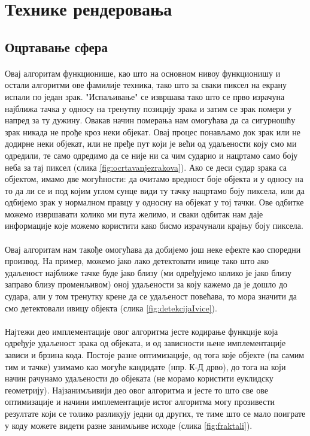 \documentclass[12pt]{article}
\begin{document}
	\pagebreak
	
	\section{Технике рендеровања}
	
	\subsection{Оцртавање сфера}\label{sfericnorenderovanje}
	\paragraph{}
	Овај алгоритам функционише, као што на основном нивоу функционишу и остали алгоритми ове фамилије техника, тако што за сваки пиксел на екрану испали по један зрак. "Испаљивање" се извршава тако што се прво израчуна најближа тачка у односу на тренутну позицију зрака и затим се зрак помери у напред за ту дужину. Овакав начин померања нам омогућава да са сигурношћу зрак никада не прође кроз неки објекат. Овај процес понављамо док зрак или не додирне неки објекат, или не пређе пут који је већи од удаљености коју смо ми одредили, те само одредимо да се није ни са чим сударио и нацртамо само боју неба за тај пиксел (слика \ref{fig:ocrtavanjezrakova}). Ако се деси судар зрака са објектом, имамо две могућности: да очитамо вредност боје објекта и у односу на то да ли се и под којим углом сунце види ту тачку нацртамо боју пиксела, или да одбијемо зрак у нормалном правцу у односну на објекат у тој тачки. Ове одбитке можемо извршавати колико ми пута желимо, и сваки одбитак нам даје информације које можемо користити како бисмо израчунали крајњу боју пиксела.
	\paragraph{}
	Овај алгоритам нам такође омогућава да добијемо још неке ефекте као споредни производ. На пример, можемо јако лако детектовати ивице тако што ако удаљеност најближе тачке буде јако близу (ми одређујемо колико је јако близу заправо близу променљивом) оној удаљености за коју кажемо да је дошло до судара, али у том тренутку крене да се удаљеност повећава, то мора значити да смо детектовали ивицу објекта (слика \ref{fig:detekcijaIvice}).
	\paragraph{}
	Најтежи део имплементације овог алгоритма јесте кодирање функције која одређује удаљеност зрака од објеката, и од зависности њене имплементације зависи и брзина кода. Постоје разне оптимизације, од тога које објекте (па самим тим и тачке) узимамо као могуће кандидате (нпр. К-Д дрво), до тога на који начин рачунамо удаљености до објеката (не морамо користити еуклидску геометрију).  Најзанимљивији део овог алгоритма и јесте то што све ове оптимизације и начини имплементације истог алгоритма могу прозивести резултате који се толико разликују једни од других, те тиме што се мало поиграте у коду можете видети разне занимљиве исходе (слика \ref{fig:fraktali}).
	
\end{document}
